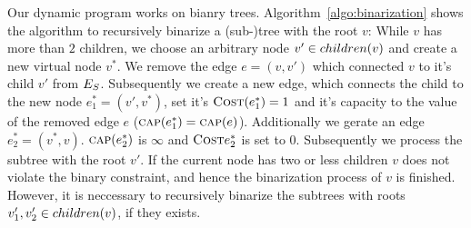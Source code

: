 \begin{algorithm}[tbhp]
\DontPrintSemicolon %
\SetAlgoNoEnd
\KwIn{$\SubstrateNode \in \SubstrateNodes$}
\vspace{6pt}

\caption{$binarize(\SubstrateNode \in \SubstrateNodes)$}
\label{algo:binarization}
\end{algorithm}








Our dynamic program works on bianry trees. Algorithm~\ref{algo:binarization} 
shows the algorithm to recursively binarize a (sub-)tree with the root $v$:
While $v$ has more than 
$2$ children, we choose an arbitrary node $v' \in children(v)$ 
and create a new virtual node $v^*$. We remove the edge $e = (v, v')$ which 
connected $v$ to it's child $v'$ from $E_S$. Subsequently we create 
a new edge, which connects the 
child to the new node $e^*_1 = (v', v^*)$, set it's 
$\textsc{Cost}(e^*_1) = 1$ and it's capacity to the value of the removed edge $e$ 
($\textsc{cap}(e^*_1) = \textsc{cap}(e)$). Additionally we gerate an edge $e^*_2 = 
(v^*, v)$. $\textsc{cap}(e^*_2)$ is $\infty$ and $\textsc{Cost}{e^*_2}$ is set to $0$.
Subsequently we process the subtree with the root $v'$. If the current node has 
two or less children $v$ does not violate the binary constraint, and hence the 
binarization process of $v$ is finished. However, it is neccessary to 
recursively binarize the subtrees with roots $v'_1, v'_2 \in children(v)$, if 
they exists.

